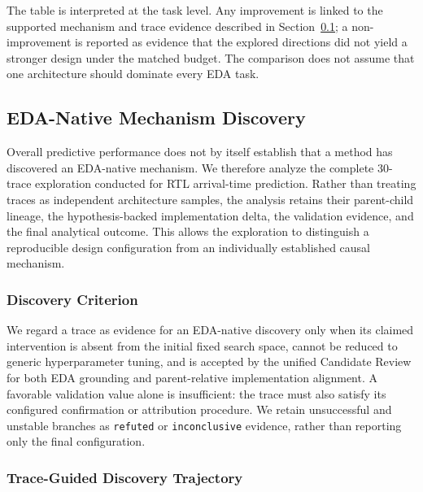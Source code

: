 The table is interpreted at the task level. Any improvement is linked to the supported mechanism and trace evidence described in Section~\ref{sec:mechanism_discovery}; a non-improvement is reported as evidence that the explored directions did not yield a stronger design under the matched budget. The comparison does not assume that one architecture should dominate every EDA task.


\subsection{EDA-Native Mechanism Discovery}
\label{sec:mechanism_discovery}

Overall predictive performance does not by itself establish that a method has
discovered an EDA-native mechanism. We therefore analyze the complete
30-trace exploration conducted for RTL arrival-time prediction. Rather than
treating traces as independent architecture samples, the analysis retains their
parent-child lineage, the hypothesis-backed implementation delta, the
validation evidence, and the final analytical outcome. This allows the
exploration to distinguish a reproducible design configuration from an
individually established causal mechanism.

\subsubsection{Discovery Criterion}

We regard a trace as evidence for an EDA-native discovery only when its claimed
intervention is absent from the initial fixed search space, cannot be reduced to
generic hyperparameter tuning, and is accepted by the unified Candidate Review
for both EDA grounding and parent-relative implementation alignment. A
favorable validation value alone is insufficient: the trace must also satisfy
its configured confirmation or attribution procedure. We retain unsuccessful
and unstable branches as \texttt{refuted} or \texttt{inconclusive} evidence,
rather than reporting only the final configuration.

\subsubsection{Trace-Guided Discovery Trajectory}

